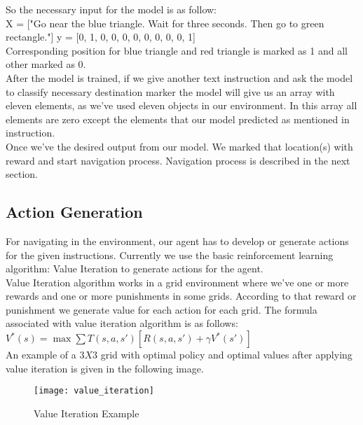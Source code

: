 So the necessary input for the model is as follow:\\
X = ["Go near the blue triangle. Wait for three seconds. Then go to green rectangle."]
y = [0, 1, 0, 0, 0, 0, 0, 0, 0, 0, 1]\\

Corresponding position for blue triangle and red triangle is marked as 1 and all other marked as 0.\\

After the model is trained, if we give another text instruction and ask the model to classify necessary destination marker the model will give us an array with eleven elements, as we've used eleven objects in our environment. In this array all elements are zero except the elements that our model predicted as mentioned in instruction.\\

Once we've the desired output from our model. We marked that location(s) with reward and start navigation process. Navigation process is described in the next section.

\subsection{Action Generation}
For navigating in the environment, our agent has to develop or generate actions for the given instructions. Currently we use the basic reinforcement learning algorithm: Value Iteration to generate actions for the agent.\\

Value Iteration algorithm works in a grid environment where we've one or more rewards and one or more punishments in some grids. According to that reward or punishment we generate value for each action for each grid. The formula associated with value iteration algorithm is as follows:\\

$V^*(s) = \max \sum T(s, a, s')[R(s, a, s')  + \gamma V^*(s')]$\\

An example of a $3 X 3$ grid with optimal policy and optimal values after applying value iteration is given in the following image.\\


\begin{figure}[ht]
    \centering
    \texttt{[image: value\_iteration]}
    \caption{Value Iteration Example}
\end{figure}
\vline

